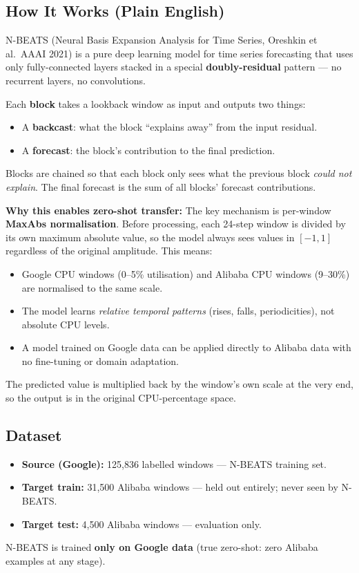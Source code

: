 \documentclass[12pt,a4paper]{article}
\begin{document}
\subsection{How It Works (Plain English)}

N-BEATS (Neural Basis Expansion Analysis for Time Series, Oreshkin et al.\ AAAI 2021) is a
pure deep learning model for time series forecasting that uses only fully-connected layers
stacked in a special \textbf{doubly-residual} pattern --- no recurrent layers, no convolutions.

Each \textbf{block} takes a lookback window as input and outputs two things:
\begin{itemize}
  \item A \textbf{backcast}: what the block ``explains away'' from the input residual.
  \item A \textbf{forecast}: the block's contribution to the final prediction.
\end{itemize}

Blocks are chained so that each block only sees what the previous block
\emph{could not explain}.  The final forecast is the sum of all blocks' forecast
contributions.

\textbf{Why this enables zero-shot transfer:} The key mechanism is per-window
\textbf{MaxAbs normalisation}.  Before processing, each 24-step window is divided by
its own maximum absolute value, so the model always sees values in $[-1, 1]$ regardless
of the original amplitude.  This means:
\begin{itemize}
  \item Google CPU windows (0--5\% utilisation) and Alibaba CPU windows (9--30\%)
        are normalised to the same scale.
  \item The model learns \emph{relative temporal patterns} (rises, falls, periodicities),
        not absolute CPU levels.
  \item A model trained on Google data can be applied directly to Alibaba data with
        no fine-tuning or domain adaptation.
\end{itemize}
The predicted value is multiplied back by the window's own scale at the very end,
so the output is in the original CPU-percentage space.

\subsection{Dataset}

\begin{itemize}
  \item \textbf{Source (Google):} 125,836 labelled windows --- N-BEATS training set.
  \item \textbf{Target train:} 31,500 Alibaba windows --- held out entirely; never seen by N-BEATS.
  \item \textbf{Target test:} 4,500 Alibaba windows --- evaluation only.
\end{itemize}
N-BEATS is trained \textbf{only on Google data} (true zero-shot: zero Alibaba examples at any stage).
\end{document}
